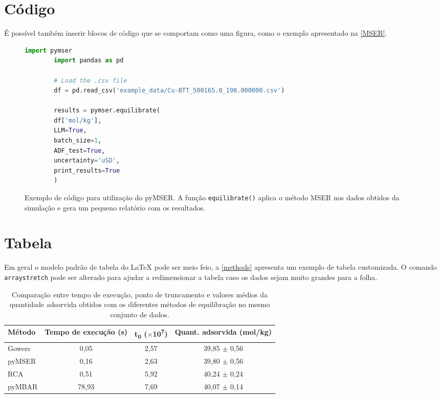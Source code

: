 \section{Código}

É possível também inserir blocos de código que se comportam como uma figura, como o exemplo apresentado na \autoref{MSER}.

\begin{figure}[!ht]
	\centering
	\caption{Exemplo de código para utilização do pyMSER. A função \texttt{equilibrate()} aplica o método MSER nos dados obtidos da simulação e gera um pequeno relatório com os resultados.}
	\label{MSER}
	\begin{lstlisting}[language=Python]
		import pymser
		import pandas as pd
		
		# Load the .csv file
		df = pd.read_csv('example_data/Cu-BTT_500165.0_198.000000.csv')
		
		results = pymser.equilibrate(
		df['mol/kg'], 
		LLM=True, 
		batch_size=1, 
		ADF_test=True, 
		uncertainty='uSD', 
		print_results=True
		)
	\end{lstlisting}
	
\end{figure}


\section{Tabela}

Em geral o modelo padrão de tabela do LaTeX pode ser meio feio, a \autoref{methods} apresenta um exemplo de tabela customizada. O comando \texttt{arraystretch} pode ser alterado para ajudar a redimensionar a tabela caso os dados sejam muito grandes para a folha. 

\begin{table}[ht!]
	\caption{Comparação entre tempo de execução, ponto de truncamento e valores médios da quantidade adsorvida obtidos com os diferentes métodos de equilibração no mesmo conjunto de dados.}
	\label{methods}
	\centering
	\renewcommand{\arraystretch}{1}
	\begin{tabular}{l|c|c|c}
		\hline\hline
		\textbf{Método} & \textbf{Tempo de execução (s)} & \textbf{t\textsubscript{0}} ($\times$10\textsuperscript{7}) & \textbf{Quant. adsorvida (mol/kg)} \\ \hline
		Gowers          & 0,05   & 2,57 & 39,85 $\pm$ 0,56 \\
		pyMSER          & 0,16   & 2,63 & 39,80 $\pm$ 0,56 \\
		RCA             & 0,51   & 5,92 & 40,24 $\pm$ 0,24 \\
		pyMBAR          & 78,93  & 7,69 & 40,07 $\pm$ 0,14 \\
		\hline \hline
	\end{tabular}
\end{table}
